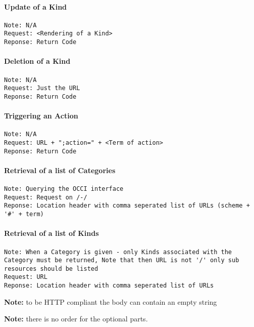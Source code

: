 \documentclass[10pt,a4paper]{article}
\begin{document}
\paragraph{Update of a Kind}
\begin{verbatim}
Note: N/A
Request: <Rendering of a Kind>
Reponse: Return Code
\end{verbatim}

\paragraph{Deletion of a Kind}
\begin{verbatim}
Note: N/A
Request: Just the URL
Reponse: Return Code
\end{verbatim}

\paragraph{Triggering an Action}
\begin{verbatim}
Note: N/A
Request: URL + ";action=" + <Term of action>
Reponse: Return Code
\end{verbatim}

\paragraph{Retrieval of a list of Categories}
\begin{verbatim}
Note: Querying the OCCI interface
Request: Request on /-/
Reponse: Location header with comma seperated list of URLs (scheme + '#' + term)
\end{verbatim}

\paragraph{Retrieval of a list of Kinds}
\begin{verbatim}
Note: When a Category is given - only Kinds associated with the Category must be returned, Note that then URL is not '/' only sub resources should be listed
Request: URL
Reponse: Location header with comma seperated list of URLs
\end{verbatim}

\textbf{Note:} to be HTTP compliant the body can contain an empty string

\textbf{Note:} there is no order for the optional parts.

%
\end{document}
